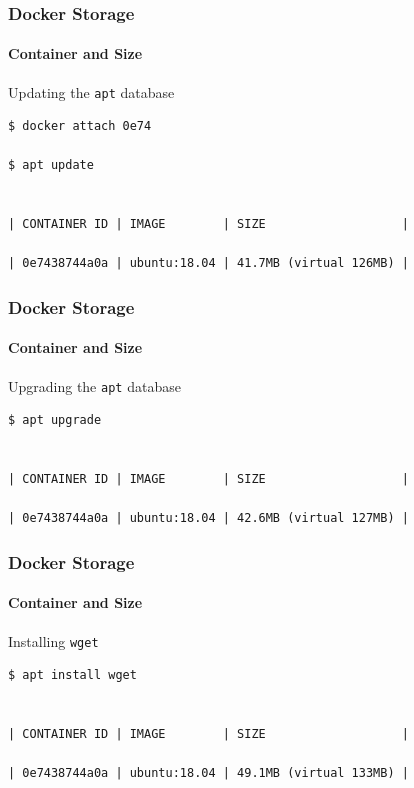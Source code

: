 \begin{frame}[fragile]
\frametitle{Docker Storage}
\framesubtitle{Container and Size}
Updating the \lstinline!apt! database
\vspace{0.4cm}
\begin{lstlisting}
$ docker attach 0e74

$ apt update


| CONTAINER ID | IMAGE        | SIZE                   |

| 0e7438744a0a | ubuntu:18.04 | 41.7MB (virtual 126MB) |
\end{lstlisting}
\end{frame}

\begin{frame}[fragile]
\frametitle{Docker Storage}
\framesubtitle{Container and Size}
Upgrading the \lstinline!apt! database
\vspace{0.4cm}
\begin{lstlisting}
$ apt upgrade


| CONTAINER ID | IMAGE        | SIZE                   |

| 0e7438744a0a | ubuntu:18.04 | 42.6MB (virtual 127MB) |
\end{lstlisting}
\end{frame}

\begin{frame}[fragile]
\frametitle{Docker Storage}
\framesubtitle{Container and Size}
Installing \lstinline!wget!
\vspace{0.4cm}
\begin{lstlisting}
$ apt install wget


| CONTAINER ID | IMAGE        | SIZE                   |

| 0e7438744a0a | ubuntu:18.04 | 49.1MB (virtual 133MB) |
\end{lstlisting}
\end{frame}

